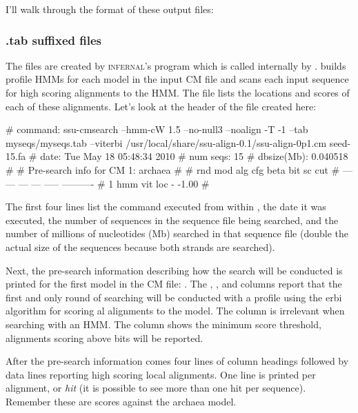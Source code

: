 I'll walk through the format of these output files:

\subsubsection{.tab suffixed files}

The  files are created by \textsc{infernal}'s
 program which is called internally by
.  builds profile HMMs for each model
in the input CM file and scans each input sequence for high scoring
alignments to the HMM\@. The  file lists the locations and
scores of each of these alignments. Let's look at the header of the 
 file created here:

\begin{sreoutput}
# command:    ssu-cmsearch --hmm-cW 1.5 --no-null3 --noalign -T -1 --tab myseqs/myseqs.tab --viterbi 
/usr/local/share/ssu-align-0.1/ssu-align-0p1.cm seed-15.fa
# date:       Tue May 18 05:48:34 2010
# num seqs:   15
# dbsize(Mb): 0.040518
#
# Pre-search info for CM 1: archaea
#
# rnd  mod  alg  cfg   beta  bit sc cut
# ---  ---  ---  ---  -----  ----------
#   1  hmm  vit  loc      -       -1.00
#
\end{sreoutput}

The first four lines list the  command executed from
within , the date it was executed, the number of
sequences in the sequence file being searched, and the number of
millions of nucleotides (Mb) searched in that sequence file (double the
actual size of the sequences because both strands are searched).

Next, the pre-search information describing how the search will be
conducted is printed for the first model in the CM file: . 
The , ,  and  columns report
that the first and only round of searching will be conducted with a
profile  using the erbi algorithm for scoring
al alignments to the model. The 
column is irrelevant when searching with an HMM\@. The 
column shows the minimum score threshold, alignments scoring above
 bits will be reported.

After the pre-search information comes four lines of column headings
followed by data lines reporting high scoring local alignments. One
line is printed per alignment, or \emph{hit} (it is possible to see
more than one hit per sequence). Remember these are scores against the
archaea model.

